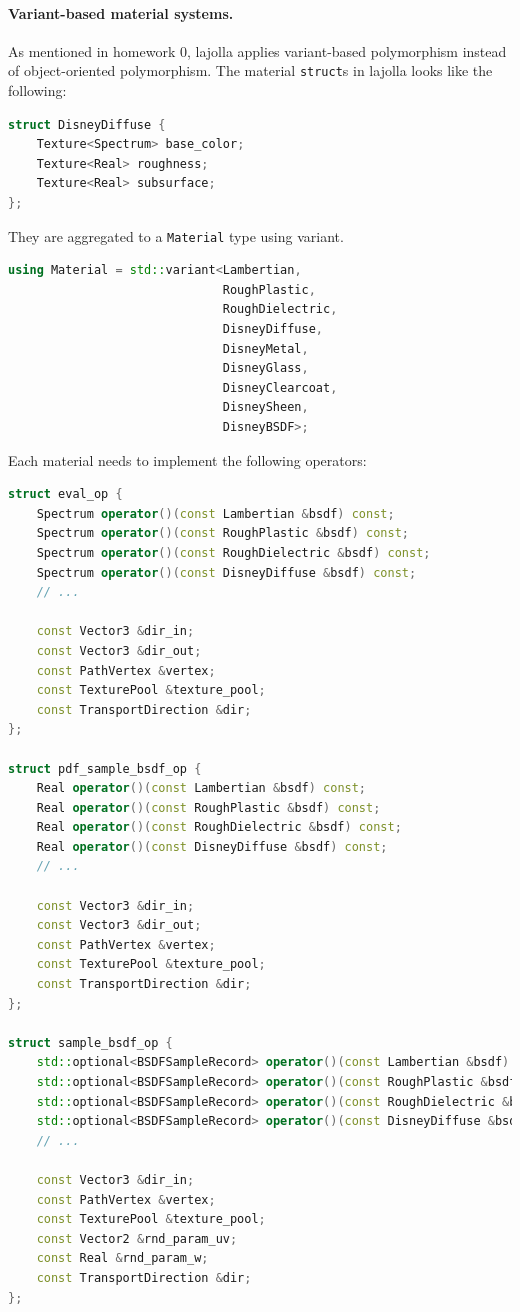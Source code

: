 \paragraph{Variant-based material systems.} As mentioned in homework 0, lajolla applies variant-based polymorphism instead of object-oriented polymorphism. The material \lstinline{struct}s in lajolla looks like the following:
\begin{lstlisting}[language=c++]
struct DisneyDiffuse {
    Texture<Spectrum> base_color;
    Texture<Real> roughness;
    Texture<Real> subsurface;
};
\end{lstlisting}
They are aggregated to a \lstinline{Material} type using variant.
\begin{lstlisting}[language=c++]
using Material = std::variant<Lambertian,
                              RoughPlastic,
                              RoughDielectric,
                              DisneyDiffuse,
                              DisneyMetal,
                              DisneyGlass,
                              DisneyClearcoat,
                              DisneySheen,
                              DisneyBSDF>;
\end{lstlisting}
Each material needs to implement the following operators:
\begin{lstlisting}[language=c++]
struct eval_op {
    Spectrum operator()(const Lambertian &bsdf) const;
    Spectrum operator()(const RoughPlastic &bsdf) const;
    Spectrum operator()(const RoughDielectric &bsdf) const;
    Spectrum operator()(const DisneyDiffuse &bsdf) const;
    // ...

    const Vector3 &dir_in;
    const Vector3 &dir_out;
    const PathVertex &vertex;
    const TexturePool &texture_pool;
    const TransportDirection &dir;
};

struct pdf_sample_bsdf_op {
    Real operator()(const Lambertian &bsdf) const;
    Real operator()(const RoughPlastic &bsdf) const;
    Real operator()(const RoughDielectric &bsdf) const;
    Real operator()(const DisneyDiffuse &bsdf) const;
    // ...

    const Vector3 &dir_in;
    const Vector3 &dir_out;
    const PathVertex &vertex;
    const TexturePool &texture_pool;
    const TransportDirection &dir;
};

struct sample_bsdf_op {
    std::optional<BSDFSampleRecord> operator()(const Lambertian &bsdf) const;
    std::optional<BSDFSampleRecord> operator()(const RoughPlastic &bsdf) const;
    std::optional<BSDFSampleRecord> operator()(const RoughDielectric &bsdf) const;
    std::optional<BSDFSampleRecord> operator()(const DisneyDiffuse &bsdf) const;
    // ...

    const Vector3 &dir_in;
    const PathVertex &vertex;
    const TexturePool &texture_pool;
    const Vector2 &rnd_param_uv;
    const Real &rnd_param_w;
    const TransportDirection &dir;
};
\end{lstlisting}

